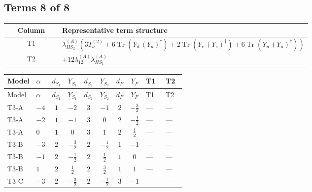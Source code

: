\documentclass[8pt]{article}
\begin{document}
\begin{landscape}
\subsection*{Terms 8 of 8}
\begin{center}
\begin{tabular}{@{}c >{\raggedright\arraybackslash}p{0.82\linewidth}@{}}
\toprule
Column & Representative term structure \\
\midrule
T1 & \(\displaystyle {\lambda_{HS_2}^{(A)}} (3 T_{\nu}^{(2)}+6 \operatorname{Tr}\!\left({Y_d}\,\left({Y_d}\right)^{\dagger}\right)+2 \operatorname{Tr}\!\left({Y_e}\,\left({Y_e}\right)^{\dagger}\right)+6 \operatorname{Tr}\!\left({Y_u}\,\left({Y_u}\right)^{\dagger}\right))\) \\
\midrule
T2 & \(\displaystyle +12 {\lambda_{12}^{(A)}} {\lambda_{HS_1}^{(A)}}\) \\
\midrule
\bottomrule
\end{tabular}
\end{center}
\smallskip
\tiny
\begin{longtable}{@{}llcccccc >{\raggedright\arraybackslash}p{0.21\linewidth} >{\raggedright\arraybackslash}p{0.21\linewidth}@{}}
\toprule
Model & $\alpha$ & $d_{S_1}$ & $Y_{S_1}$ & $d_{S_2}$ & $Y_{S_2}$ & $d_F$ & $Y_F$ & T1 & T2 \\
\midrule
\endfirsthead
\toprule
Model & $\alpha$ & $d_{S_1}$ & $Y_{S_1}$ & $d_{S_2}$ & $Y_{S_2}$ & $d_F$ & $Y_F$ & T1 & T2 \\
\midrule
\endhead
T3-A & $-4$ & $1$ & $-2$ & $3$ & $-1$ & $2$ & $-\frac{3}{2}$ & --- & --- \\
\midrule
T3-A & $-2$ & $1$ & $-1$ & $3$ & $0$ & $2$ & $-\frac{1}{2}$ & --- & --- \\
\midrule
T3-A & $0$ & $1$ & $0$ & $3$ & $1$ & $2$ & $\frac{1}{2}$ & --- & --- \\
\midrule
T3-B & $-3$ & $2$ & $-\frac{3}{2}$ & $2$ & $-\frac{1}{2}$ & $1$ & $-1$ & --- & --- \\
\midrule
T3-B & $-1$ & $2$ & $-\frac{1}{2}$ & $2$ & $\frac{1}{2}$ & $1$ & $0$ & --- & --- \\
\midrule
T3-B & $1$ & $2$ & $\frac{1}{2}$ & $2$ & $\frac{3}{2}$ & $1$ & $1$ & --- & --- \\
\midrule
T3-C & $-3$ & $2$ & $-\frac{3}{2}$ & $2$ & $-\frac{1}{2}$ & $3$ & $-1$ & \scriptsize\adjustbox{max width=\linewidth}{$\begin{gathered} {\lambda_{HS_2}^{(A)}} (3 T_{\nu}^{(2)}+6 \operatorname{Tr}\!\left({Y_d}\,\left({Y_d}\right)^{\dagger}\right)+2 \operatorname{Tr}\!\left({Y_e}\,\left({Y_e}\right)^{\dagger}\right)+6 \operatorname{Tr}\!\left({Y_u}\,\left({Y_u}\right)^{\dagger}\right))\end{gathered}$} & --- \\

\end{longtable}
\end{landscape}
\end{document}
